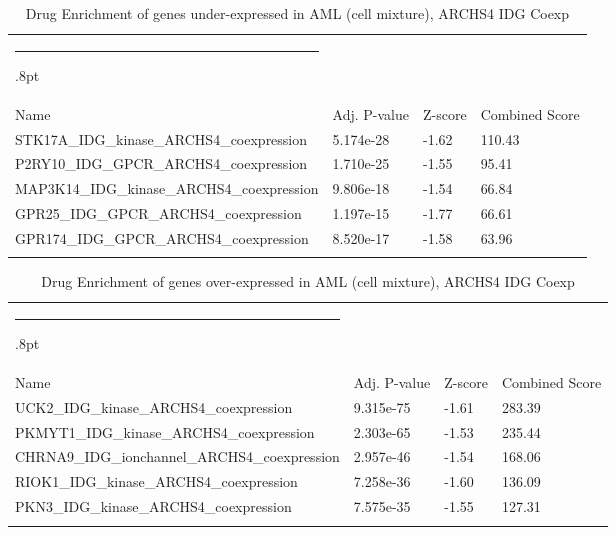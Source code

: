 \documentclass[3p,authoryear,preprint,12pt]{elsarticle}
\makeatletter
\def\hlinewd#1{%
  \noalign{\ifnum0=`}\fi\hrule \@height #1%
  \futurelet\reserved@a\@xhline}
\def\tbltoprule{\hlinewd{.8pt}\\[-12pt]}
\def\tblbottomrule{\noalign{\vspace*{6pt}}\hline\noalign{\vspace*{2pt}}}
\def\tblmidrule{\noalign{\vspace*{6pt}}\hline\noalign{\vspace*{2pt}}}
\makeatother
\begin{document}
\begin{table}[!htbp]
	\caption{{Drug Enrichment of genes under-expressed in AML (cell mixture), ARCHS4 IDG Coexp} }
	\label{tw-de478ae31vc6}
	\def\arraystretch{1}
	\ignorespaces 
	\centering 
	\begin{tabulary}{\linewidth}{p{\dimexpr.65\tabcolsep}p{\dimexpr.15\tabcolsep}p{\dimexpr.1\tabcolsep}p{\dimexpr.1\tabcolsep}}
		\tbltoprule Name & Adj. P-value & Z-score & Combined Score\\
		\tblmidrule
STK17A\_IDG\_kinase\_ARCHS4\_coexpression & 5.174e-28 & -1.62 & 110.43 \\
P2RY10\_IDG\_GPCR\_ARCHS4\_coexpression & 1.710e-25 & -1.55 & 95.41 \\
MAP3K14\_IDG\_kinase\_ARCHS4\_coexpression & 9.806e-18 & -1.54 & 66.84 \\
GPR25\_IDG\_GPCR\_ARCHS4\_coexpression & 1.197e-15 & -1.77 & 66.61 \\
GPR174\_IDG\_GPCR\_ARCHS4\_coexpression & 8.520e-17 & -1.58 & 63.96 \\
		\tblbottomrule
	\end{tabulary}\par 
\end{table}
\begin{table}[!htbp]
	\caption{{Drug Enrichment of genes over-expressed in AML (cell mixture), ARCHS4 IDG Coexp} }
	\label{tw-de478ae31wc6}
	\def\arraystretch{1}
	\ignorespaces 
	\centering 
	\begin{tabulary}{\linewidth}{p{\dimexpr.65\tabcolsep}p{\dimexpr.15\tabcolsep}p{\dimexpr.1\tabcolsep}p{\dimexpr.1\tabcolsep}}
		\tbltoprule Name & Adj. P-value & Z-score & Combined Score\\
		\tblmidrule
UCK2\_IDG\_kinase\_ARCHS4\_coexpression & 9.315e-75 & -1.61 & 283.39 \\
PKMYT1\_IDG\_kinase\_ARCHS4\_coexpression & 2.303e-65 & -1.53 & 235.44 \\
CHRNA9\_IDG\_ionchannel\_ARCHS4\_coexpression & 2.957e-46 & -1.54 & 168.06 \\
RIOK1\_IDG\_kinase\_ARCHS4\_coexpression & 7.258e-36 & -1.60 & 136.09 \\
PKN3\_IDG\_kinase\_ARCHS4\_coexpression & 7.575e-35 & -1.55 & 127.31 \\
		\tblbottomrule
	\end{tabulary}\par 
\end{table}
\end{document}
